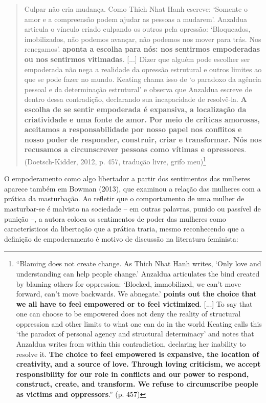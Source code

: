 \begin{quote}
    Culpar não cria mudança. Como Thich Nhat Hanh escreve: ‘Somente o amor e a compreensão podem ajudar as pessoas a mudarem’. Anzaldua articula o vínculo criado culpando os outros pela opressão: ‘Bloqueados, imobilizados, não podemos avançar, não podemos nos mover para trás. Nos renegamos’. \textbf{aponta a escolha para nós: nos sentirmos empoderadas ou nos sentirmos vitimadas}. [...] Dizer que alguém pode escolher ser empoderada não nega a realidade da opressão estrutural e outros limites ao que se pode fazer no mundo. Keating chama isso de ‘o paradoxo da agência pessoal e da determinação estrutural’ e observa que Anzaldua escreve de dentro dessa contradição, declarando sua incapacidade de resolvê-la. \textbf{A escolha de se sentir empoderada é expansiva, a localização da criatividade e uma fonte de amor. Por meio de críticas amorosas, aceitamos a responsabilidade por nosso papel nos conflitos e nosso poder de responder, construir, criar e transformar. Nós nos recusamos a circunscrever pessoas como vítimas e opressores}. (Doetsch-Kidder, 2012, p. 457, tradução livre, grifo meu)\footnote{``Blaming does not create change. As Thich Nhat Hanh writes, ‘Only love and understanding can help people change.’ Anzaldua articulates the bind created by blaming others for oppression: ‘Blocked, immobilized, we can't move forward, can't move backwards. We abnegate.’ \textbf{points out the choice that we all have to feel empowered or to feel victimized}. [...] To say that one can choose to be empowered does not deny the reality of structural oppression and other limits to what one can do in the world Keating calls this ‘the paradox of personal agency and structural determinacy’ and notes that Anzaldua writes from within this contradiction, declaring her inability to resolve it. \textbf{The choice to feel empowered is expansive, the location of creativity, and a source of love. Through loving criticism, we accept responsibility for our role in conflicts and our power to respond, construct, create, and transform. We refuse to circumscribe people as victims and oppressors}.'' (p. 457)}
\end{quote}

O empoderamento como algo libertador a partir dos sentimentos das mulheres aparece também em Bowman (2013), que examinou a relação das mulheres com a prática da masturbação. Ao refletir que o comportamento de uma mulher de masturbar-se é malvisto na sociedade – em outras palavras, punido ou passível de punição –, a autora coloca os sentimentos de poder das mulheres como característicos da libertação que a prática traria, mesmo reconhecendo que a definição de empoderamento é motivo de discussão na literatura feminista:

